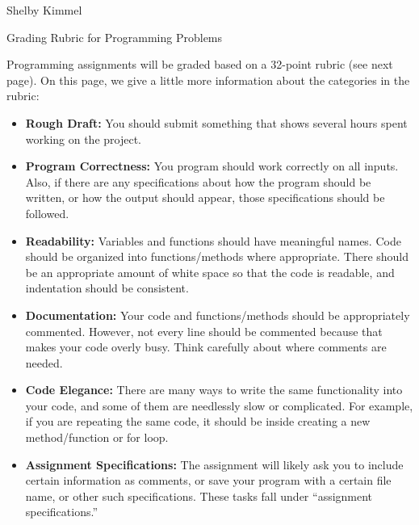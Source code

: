 \documentclass[11pt,landscape]{article}
\begin{document}
\hfill Shelby Kimmel

\begin{center}
{\huge Grading Rubric for Programming Problems}
\end{center}
\bigskip

Programming assignments will be graded based on a 32-point rubric (see next page). On this page, we give a little more information about the categories in the rubric:

\begin{itemize}
\item \textbf{Rough Draft:} You should submit something that shows several hours spent working on the project.

\item \textbf{Program Correctness:} You program should work correctly on all inputs. Also, if there are any specifications about how the program should be written, or how the output should appear, those specifications should be followed.

\item \textbf{Readability:} Variables and functions should have meaningful names. Code should be organized into functions/methods where appropriate. There should be an appropriate amount of white space so that the code is readable, and indentation should be consistent.

\item \textbf{Documentation:} Your code and functions/methods should be appropriately commented. However, not every line should be commented because that makes your code overly busy. Think carefully about where comments are needed. 

\item \textbf{Code Elegance:} There are many ways to write the same functionality into your code, and some of them are needlessly slow or complicated. For example, if you are repeating the same code, it should be inside  creating a new method/function or for loop.

\item \textbf{Assignment Specifications:} The assignment will likely ask you to include certain information as comments, or save your program with a certain file name, or other such specifications. These tasks fall under ``assignment specifications.''
\end{itemize}
\end{document}
